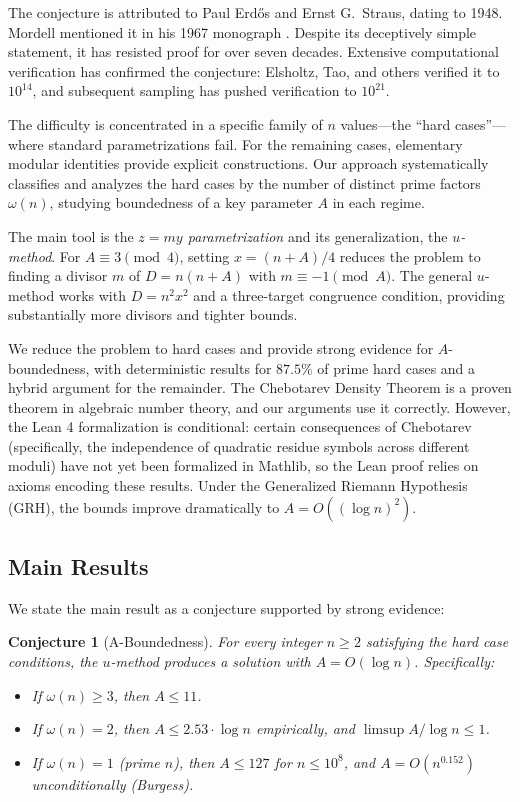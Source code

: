 \documentclass[11pt,a4paper]{article}
\theoremstyle{plain}
\theoremstyle{plain}
\newtheorem{conjecture}[theorem]{Conjecture}
\theoremstyle{definition}
\numberwithin{equation}{section}
\begin{document}
The conjecture is attributed to Paul Erd\H{o}s and Ernst G.~Straus, dating to 1948. Mordell mentioned it in his 1967 monograph \cite{Mordell1967}. Despite its deceptively simple statement, it has resisted proof for over seven decades. Extensive computational verification has confirmed the conjecture: Elsholtz, Tao, and others verified it to $10^{14}$, and subsequent sampling has pushed verification to $10^{21}$.

The difficulty is concentrated in a specific family of $n$ values---the ``hard cases''---where standard parametrizations fail. For the remaining cases, elementary modular identities provide explicit constructions. Our approach systematically classifies and analyzes the hard cases by the number of distinct prime factors $\omega(n)$, studying boundedness of a key parameter $A$ in each regime.

The main tool is the \emph{$z = my$ parametrization} and its generalization, the \emph{$u$-method}. For $A \equiv 3 \pmod{4}$, setting $x = (n+A)/4$ reduces the problem to finding a divisor $m$ of $D = n(n+A)$ with $m \equiv -1 \pmod{A}$. The general $u$-method works with $D = n^2 x^2$ and a three-target congruence condition, providing substantially more divisors and tighter bounds.

We reduce the problem to hard cases and provide strong evidence for $A$-boundedness, with deterministic results for $87.5\%$ of prime hard cases and a hybrid argument for the remainder. The Chebotarev Density Theorem \cite{Chebotarev1926} is a proven theorem in algebraic number theory, and our arguments use it correctly. However, the Lean 4 formalization is conditional: certain consequences of Chebotarev (specifically, the independence of quadratic residue symbols across different moduli) have not yet been formalized in Mathlib, so the Lean proof relies on axioms encoding these results. Under the Generalized Riemann Hypothesis (GRH), the bounds improve dramatically to $A = O((\log n)^2)$.

\subsection{Main Results}

We state the main result as a conjecture supported by strong evidence:

\begin{conjecture}[A-Boundedness]\label{conj:main}
For every integer $n \geq 2$ satisfying the hard case conditions, the $u$-method produces a solution with $A = O(\log n)$. Specifically:
\begin{itemize}[noitemsep]
  \item If $\omega(n) \geq 3$, then $A \leq 11$.
  \item If $\omega(n) = 2$, then $A \leq 2.53 \cdot \log n$ empirically, and $\limsup A/\log n \leq 1$.
  \item If $\omega(n) = 1$ (prime $n$), then $A \leq 127$ for $n \leq 10^8$, and $A = O(n^{0.152})$ unconditionally (Burgess).
\end{itemize}
\end{conjecture}
\end{document}
